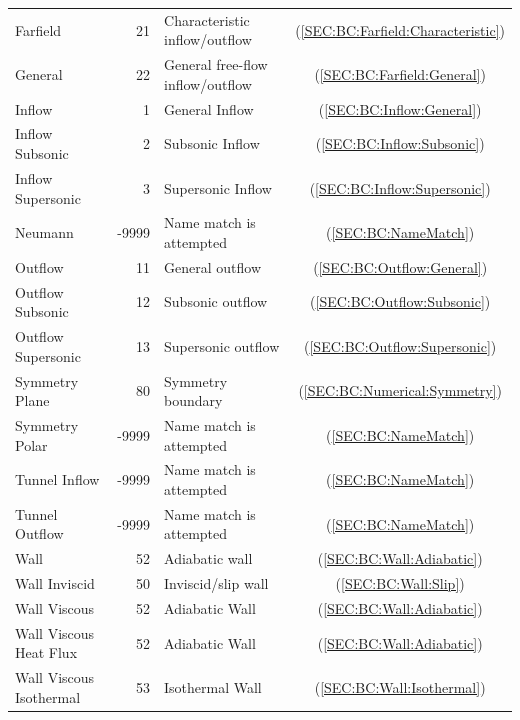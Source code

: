 \begin{table}[tb]
\begin{tabular}{ @{} l r @{\qquad} l @{\qquad} c @{} }
    Farfield                &    21 & Characteristic inflow\slash outflow
                                    & (\ref{SEC:BC:Farfield:Characteristic}) \\
    General                 &    22 & General free-flow inflow\slash outflow
                                    & (\ref{SEC:BC:Farfield:General}) \\
    Inflow                  &     1 & General Inflow
                                    & (\ref{SEC:BC:Inflow:General}) \\
    Inflow Subsonic         &     2 & Subsonic Inflow
                                    & (\ref{SEC:BC:Inflow:Subsonic}) \\
    Inflow Supersonic       &     3 & Supersonic Inflow
                                    & (\ref{SEC:BC:Inflow:Supersonic}) \\
    Neumann                 & -9999 & Name match is attempted
                                    & (\ref{SEC:BC:NameMatch}) \\
    Outflow                 &    11 & General outflow
                                    & (\ref{SEC:BC:Outflow:General}) \\
    Outflow Subsonic        &    12 & Subsonic outflow
                                    & (\ref{SEC:BC:Outflow:Subsonic}) \\
    Outflow Supersonic      &    13 & Supersonic outflow
                                    & (\ref{SEC:BC:Outflow:Supersonic}) \\
    Symmetry Plane          &    80 & Symmetry boundary
                                    & (\ref{SEC:BC:Numerical:Symmetry}) \\
    Symmetry Polar          & -9999 & Name match is attempted
                                    & (\ref{SEC:BC:NameMatch}) \\
    Tunnel Inflow           & -9999 & Name match is attempted
                                    & (\ref{SEC:BC:NameMatch}) \\
    Tunnel Outflow          & -9999 & Name match is attempted
                                    & (\ref{SEC:BC:NameMatch}) \\
    Wall                    &    52 & Adiabatic wall
                                    & (\ref{SEC:BC:Wall:Adiabatic}) \\
    Wall Inviscid           &    50 & Inviscid\slash slip wall
                                    & (\ref{SEC:BC:Wall:Slip}) \\
    Wall Viscous            &    52 & Adiabatic Wall
                                    & (\ref{SEC:BC:Wall:Adiabatic}) \\
    Wall Viscous Heat Flux  &    52 & Adiabatic Wall
                                    & (\ref{SEC:BC:Wall:Adiabatic}) \\
    Wall Viscous Isothermal &    53 & Isothermal Wall
                                    & (\ref{SEC:BC:Wall:Isothermal}) \\
    \bottomrule
  \end{tabular}
\end{table}

